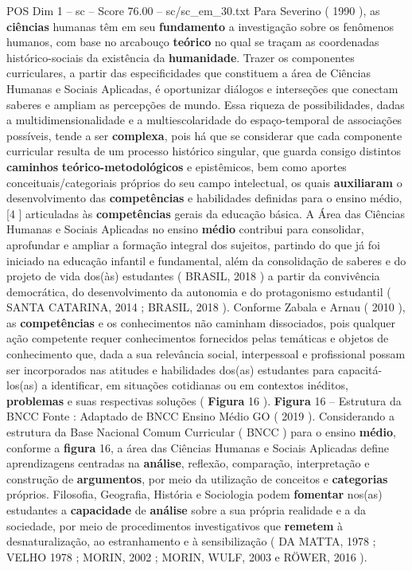 \begin{textsample}{POS Dim 1 – sc – Score 76.00 – sc/sc\_em\_30.txt}
Para Severino ( 1990 ), as \textbf{ciências} humanas têm em seu \textbf{fundamento} a investigação sobre os fenômenos humanos, com base no arcabouço \textbf{teórico} no qual se traçam as coordenadas histórico-sociais da existência da \textbf{humanidade}.
Trazer os componentes curriculares, a partir das especificidades que constituem a área de Ciências Humanas e Sociais Aplicadas, é oportunizar diálogos e interseções que conectam saberes e ampliam as percepções de mundo.
Essa riqueza de possibilidades, dadas a multidimensionalidade e a multiescolaridade do espaço-temporal de associações possíveis, tende a ser \textbf{complexa}, pois há que se considerar que cada componente curricular resulta de um processo histórico singular, que guarda consigo distintos \textbf{caminhos} \textbf{teórico-metodológicos} e epistêmicos, bem como aportes conceituais/categoriais próprios do seu campo intelectual, os quais \textbf{auxiliaram} o desenvolvimento das \textbf{competências} e habilidades definidas para o ensino médio,[4 ] articuladas às \textbf{competências} gerais da educação básica.
A Área das Ciências Humanas e Sociais Aplicadas no ensino \textbf{médio} contribui para consolidar, aprofundar e ampliar a formação integral dos sujeitos, partindo do que já foi iniciado na educação infantil e fundamental, além da consolidação de saberes e do projeto de vida dos(às) estudantes ( BRASIL, 2018 ) a partir da convivência democrática, do desenvolvimento da autonomia e do protagonismo estudantil ( SANTA CATARINA, 2014 ; BRASIL, 2018 ).
Conforme Zabala e Arnau ( 2010 ), as \textbf{competências} e os conhecimentos não caminham dissociados, pois qualquer ação competente requer conhecimentos fornecidos pelas temáticas e objetos de conhecimento que, dada a sua relevância social, interpessoal e profissional possam ser incorporados nas atitudes e habilidades dos(as) estudantes para capacitá-los(as) a identificar, em situações cotidianas ou em contextos inéditos, \textbf{problemas} e suas respectivas soluções ( \textbf{Figura} 16 ). \textbf{Figura} 16 – Estrutura da BNCC Fonte : Adaptado de BNCC Ensino Médio GO ( 2019 ).
Considerando a estrutura da Base Nacional Comum Curricular ( BNCC ) para o ensino \textbf{médio}, conforme a \textbf{figura} 16, a área das Ciências Humanas e Sociais Aplicadas define aprendizagens centradas na \textbf{análise}, reflexão, comparação, interpretação e construção de \textbf{argumentos}, por meio da utilização de conceitos e \textbf{categorias} próprios.
Filosofia, Geografia, História e Sociologia podem \textbf{fomentar} nos(as) estudantes a \textbf{capacidade} de \textbf{análise} sobre a sua própria realidade e a da sociedade, por meio de procedimentos investigativos que \textbf{remetem} à desnaturalização, ao estranhamento e à sensibilização ( DA MATTA, 1978 ; VELHO 1978 ; MORIN, 2002 ; MORIN, WULF, 2003 e RÖWER, 2016 ).

\end{textsample}
